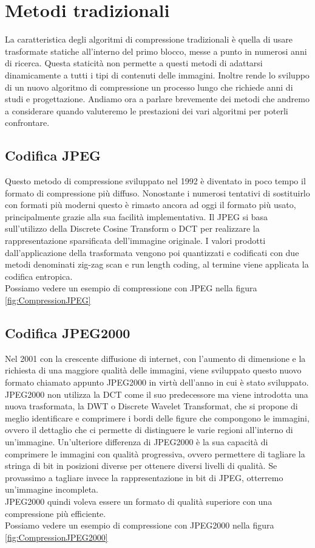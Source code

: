 \chapter{Metodi tradizionali}
La caratteristica degli algoritmi di compressione tradizionali è quella di usare trasformate statiche all’interno del primo blocco, messe a punto in numerosi anni di ricerca. Questa staticità non permette a questi metodi di adattarsi dinamicamente a tutti i tipi di contenuti delle immagini. Inoltre rende lo sviluppo di un nuovo algoritmo di compressione un processo lungo che richiede anni di studi e progettazione. \cite{cheng2018deep}
Andiamo ora a parlare brevemente dei metodi che andremo a considerare quando valuteremo le prestazioni dei vari algoritmi per poterli confrontare.

\section{Codifica JPEG}
Questo metodo di compressione sviluppato nel 1992 è diventato in poco tempo il formato di compressione più diffuso. Nonostante i numerosi tentativi di sostituirlo con formati più moderni questo è rimasto ancora ad oggi il formato più usato, principalmente grazie alla sua facilità implementativa. Il JPEG si basa sull’utilizzo della Discrete Cosine Transform o DCT per realizzare la rappresentazione sparsificata dell’immagine originale. I valori prodotti dall'applicazione della trasformata vengono poi quantizzati e codificati con due metodi denominati zig-zag scan e run length coding, al termine viene applicata la codifica entropica. \cite{125072} \\
Possiamo vedere un esempio di compressione con JPEG nella figura \ref{fig:CompressionJPEG}

\section{Codifica JPEG2000}
Nel 2001 con la crescente diffusione di internet, con l’aumento di dimensione e la richiesta di una maggiore qualità delle immagini, viene sviluppato questo nuovo formato chiamato appunto JPEG2000 in virtù dell'anno in cui è stato sviluppato.\\
JPEG2000 non utilizza la DCT come il suo predecessore ma viene introdotta una nuova trasformata, la DWT o Discrete Wavelet Transformat, che si propone di meglio identificare e comprimere i bordi delle figure che compongono le immagini, ovvero il dettaglio che ci permette di distinguere le varie regioni all'interno di un’immagine.
Un’ulteriore differenza di JPEG2000 è la sua capacità di comprimere le immagini con qualità progressiva, ovvero permettere di tagliare la stringa di bit in posizioni diverse per ottenere diversi livelli di qualità. Se provassimo a tagliare invece la rappresentazione in bit di JPEG, otterremo un’immagine incompleta.\\
JPEG2000 quindi voleva essere un formato di qualità superiore con una compressione più efficiente.\cite{952804}\\
Possiamo vedere un esempio di compressione con JPEG2000 nella figura \ref{fig:CompressionJPEG2000}

